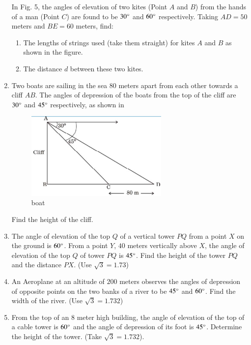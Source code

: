 \begin{enumerate}
    In Fig. 5, the angles of elevation of two kites (Point $A$ and $B$) from the hands of a man (Point $C$) are found to be $30\degree$ and $60\degree$ respectively. Taking $AD = 50$ meters and $BE = 60$ meters, find:
    \begin{enumerate}
        \item The lengths of strings used (take them straight) for kites $A$ and $B$ as shown in the figure.
        \item The distance $d$ between these two kites.
    \end{enumerate}
    
    \hfill{}\item Two boats are sailing in the sea $80$ meters apart from each other towards a cliff $AB$. The angles of depression of the boats from the top of the cliff are $30\degree$ and $45\degree$ respectively, as shown in 
    
    \begin{figure}[H]
        \centering
        \includegraphics[width=70mm]{cbse-math/figs/boat.edit.jpeg}
        \caption{boat}
        \label{fig:boat.jpeg}
    \end{figure}
    
    Find the height of the cliff.
    
    \hfill{}\item The angle of elevation of the top $Q$ of a vertical tower $PQ$ from a point $X$ on the ground is $60\degree$. From a point $Y$, $40$ meters vertically above $X$, the angle of elevation of the top $Q$ of tower $PQ$ is $45\degree$. Find the height of the tower $PQ$ and the distance $PX$. (Use $\sqrt{3} = 1.73$)
    
    \hfill{}\item An Aeroplane at an altitude of $200$ meters observes the angles of depression of opposite points on the two banks of a river to be $45\degree$ and $60\degree$. Find the width of the river. (Use $\sqrt{3} = 1.732$)
    
    \hfill{}\item From the top of an $8$ meter high building, the angle of elevation of the top of a cable tower is $60\degree$ and the angle of depression of its foot is $45\degree$. Determine the height of the tower. (Take $\sqrt{3} = 1.732$).
    

\end{enumerate}
